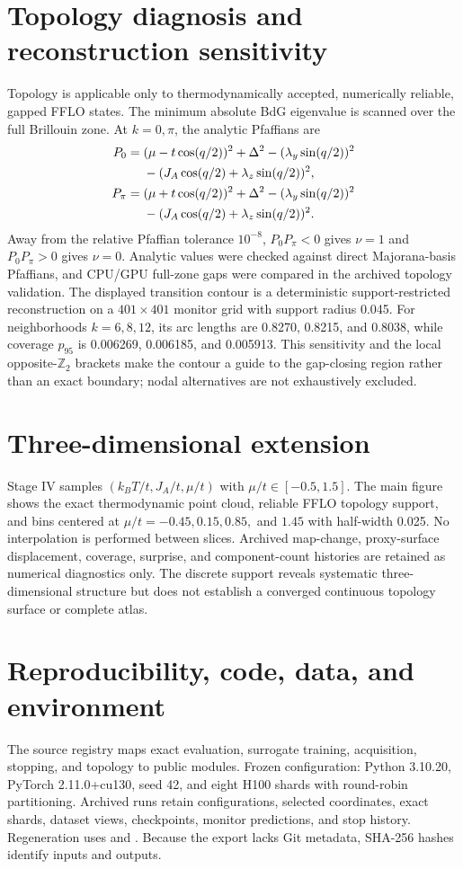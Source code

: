 \section{Topology diagnosis and reconstruction sensitivity}
Topology is applicable only to thermodynamically accepted, numerically reliable, gapped FFLO states.  The minimum absolute BdG eigenvalue is scanned over the full Brillouin zone.  At $k=0,\pi$, the analytic Pfaffians are
\begin{align}P_0={}&(\mu-t\cos(q/2))^2+\Delta^2-(\lambda_y\sin(q/2))^2\notag\\ &-(J_A\cos(q/2)+\lambda_z\sin(q/2))^2,\\ P_\pi={}&(\mu+t\cos(q/2))^2+\Delta^2-(\lambda_y\sin(q/2))^2\notag\\ &-(J_A\cos(q/2)+\lambda_z\sin(q/2))^2.\end{align}
Away from the relative Pfaffian tolerance $10^{-8}$, $P_0P_\pi<0$ gives $\nu=1$ and $P_0P_\pi>0$ gives $\nu=0$. Analytic values were checked against direct Majorana-basis Pfaffians, and CPU/GPU full-zone gaps were compared in the archived topology validation. The displayed transition contour is a deterministic support-restricted reconstruction on a $401\times401$ monitor grid with support radius 0.045.  For neighborhoods $k=6,8,12$, its arc lengths are 0.8270, 0.8215, and 0.8038, while coverage $p_{95}$ is 0.006269, 0.006185, and 0.005913. This sensitivity and the local opposite-$\mathbb Z_2$ brackets make the contour a guide to the gap-closing region rather than an exact boundary; nodal alternatives are not exhaustively excluded.

\section{Three-dimensional extension}
Stage IV samples $(k_BT/t,J_A/t,\mu/t)$ with $\mu/t\in[-0.5,1.5]$. The main figure shows the exact thermodynamic point cloud, reliable FFLO topology support, and bins centered at $\mu/t=-0.45,0.15,0.85,$ and $1.45$ with half-width 0.025. No interpolation is performed between slices. Archived map-change, proxy-surface displacement, coverage, surprise, and component-count histories are retained as numerical diagnostics only. The discrete support reveals systematic three-dimensional structure but does not establish a converged continuous topology surface or complete atlas.

\section{Reproducibility, code, data, and environment}
{\small The source registry maps exact evaluation, surrogate training, acquisition, stopping, and topology to public modules. Frozen configuration: Python 3.10.20, PyTorch 2.11.0+cu130, seed 42, and eight H100 shards with round-robin partitioning. Archived runs retain configurations, selected coordinates, exact shards, dataset views, checkpoints, monitor predictions, and stop history. Regeneration uses  and . Because the export lacks Git metadata, SHA-256 hashes identify inputs and outputs.\par}
